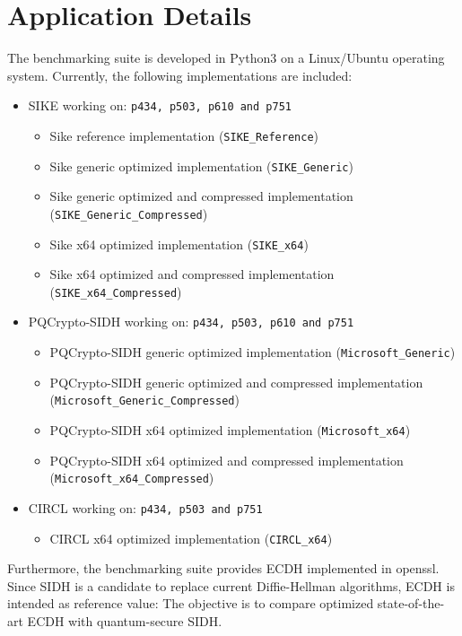 \section{Application Details}\label{sec:benchmarks_details}
The benchmarking suite is developed in Python3 on a Linux/Ubuntu operating system. Currently, the following implementations are included:
\label{sec:included_implementations}
\begin{itemize}
\item \gls{SIKE} working on: \texttt{p434, p503, p610 and p751}
	\begin{itemize}
	\item Sike reference implementation (\texttt{SIKE\_Reference})
	\item Sike generic optimized implementation (\texttt{SIKE\_Generic})
	\item Sike generic optimized and compressed implementation (\texttt{SIKE\_Generic\_Compressed})
	\item Sike x64 optimized implementation (\texttt{SIKE\_x64})
	\item Sike x64 optimized and compressed implementation (\texttt{SIKE\_x64\_Compressed})
	\end{itemize}
\item \gls{PQCrypto-SIDH} working on: \texttt{p434, p503, p610 and p751}
	\begin{itemize}
	\item PQCrypto-SIDH generic optimized implementation (\texttt{Microsoft\_Generic})
	\item PQCrypto-SIDH generic optimized and compressed implementation \\ (\texttt{Microsoft\_Generic\_Compressed})
	\item PQCrypto-SIDH x64 optimized implementation (\texttt{Microsoft\_x64})
	\item PQCrypto-SIDH x64 optimized and compressed implementation \\ (\texttt{Microsoft\_x64\_Compressed})
	\end{itemize}
\item CIRCL working on: \texttt{p434, p503 and p751}
	\begin{itemize}
	\item CIRCL x64 optimized implementation (\texttt{CIRCL\_x64})
	\end{itemize}
\end{itemize}
Furthermore, the benchmarking suite provides \gls{ECDH} implemented in \gls{openssl}. Since \gls{SIDH} is a candidate to replace current Diffie-Hellman algorithms, \gls{ECDH} is intended as reference value: The objective is to compare optimized state-of-the-art \gls{ECDH} with quantum-secure \gls{SIDH}.\\
